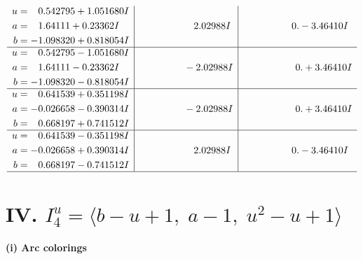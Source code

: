 \documentclass[1p]{elsarticle_modified}
\theoremstyle{definition}
\begin{document}
$$\begin{array}{c|c|c}
\begin{aligned}
u &= \phantom{-}0.542795 + 1.051680 I \\
a &= \phantom{-}1.64111 + 0.23362 I \\
b &= -1.098320 + 0.818054 I\end{aligned}
 & \phantom{-0.000000 -}2.02988 I & \phantom{-0.000000 } 0. - 3.46410 I \\ \hline\begin{aligned}
u &= \phantom{-}0.542795 - 1.051680 I \\
a &= \phantom{-}1.64111 - 0.23362 I \\
b &= -1.098320 - 0.818054 I\end{aligned}
 & \phantom{-0.000000 } -2.02988 I & \phantom{-0.000000 -}0. + 3.46410 I \\ \hline\begin{aligned}
u &= \phantom{-}0.641539 + 0.351198 I \\
a &= -0.026658 - 0.390314 I \\
b &= \phantom{-}0.668197 + 0.741512 I\end{aligned}
 & \phantom{-0.000000 } -2.02988 I & \phantom{-0.000000 -}0. + 3.46410 I \\ \hline\begin{aligned}
u &= \phantom{-}0.641539 - 0.351198 I \\
a &= -0.026658 + 0.390314 I \\
b &= \phantom{-}0.668197 - 0.741512 I\end{aligned}
 & \phantom{-0.000000 -}2.02988 I & \phantom{-0.000000 } 0. - 3.46410 I\\
 \hline 
 \end{array}$$\newpage\newpage\renewcommand{\arraystretch}{1}
\centering \section*{IV. $I^u_{4}= \langle b- u+1,\;a-1,\;u^2- u+1 \rangle$}
\flushleft \textbf{(i) Arc colorings}\\
\end{document}
